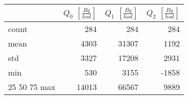 \begin{tabular}{lrrr}
\toprule
{} &  $Q_0$ $\left[\si{\frac{Bq}{hod}}\right]$ &  $Q_1$ $\left[\si{\frac{Bq}{hod}}\right]$ &  $Q_2$ $\left[\si{\frac{Bq}{hod}}\right]$ \\
\midrule
count &                                       284 &                                       284 &                                       284 \\
mean  &                                      4303 &                                     31307 &                                      1192 \\
std   &                                      3327 &                                     17208 &                                      2931 \\
min   &                                       530 &                                      3155 &                                     -1858 \\
25%
50%
75%
max   &                                     14013 &                                     66567 &                                      9889 \\
\bottomrule
\end{tabular}
